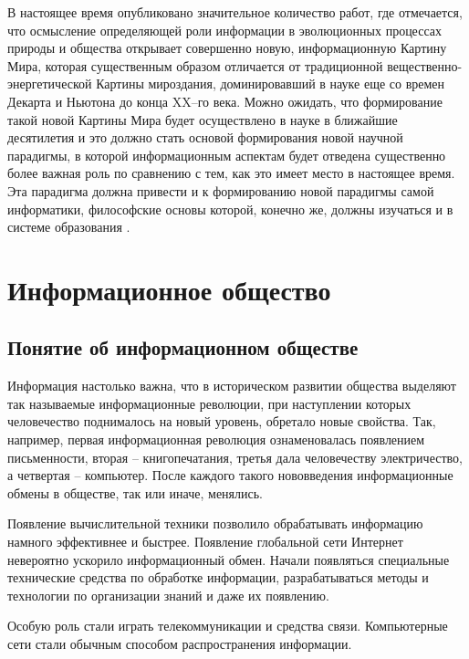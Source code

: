 В настоящее время опубликовано значительное количество работ, где отмечается, что осмысление определяющей роли информации в эволюционных процессах природы и общества открывает совершенно новую, информационную Картину Мира, которая существенным образом отличается от традиционной вещественно-энергетической Картины мироздания, доминировавший в науке еще со времен Декарта и Ньютона до конца XX–го века. Можно ожидать, что формирование такой новой Картины Мира будет осуществлено в науке в ближайшие  десятилетия и это должно стать основой формирования новой научной парадигмы, в которой информационным аспектам будет отведена существенно более важная роль по сравнению с тем, как это имеет место в настоящее время. Эта парадигма должна привести и к формированию новой парадигмы самой информатики, философские основы которой, конечно же, должны изучаться и в системе образования \cite{bib304}.




\newpage

\section{Информационное общество} \label{sect2_3}

\subsection{Понятие об информационном обществе} \label{subsect2_3_1}

Информация настолько важна, что в историческом развитии общества выделяют так называемые информационные революции, при наступлении которых человечество поднималось на новый уровень, обретало новые свойства. Так, например, первая информационная революция ознаменовалась появлением письменности, вторая – книгопечатания, третья дала человечеству электричество, а четвертая – компьютер. После каждого такого нововведения информационные обмены в обществе, так или иначе, менялись.

Появление вычислительной техники позволило обрабатывать информацию намного эффективнее и быстрее. Появление глобальной сети Интернет невероятно ускорило информационный обмен.
Начали появляться специальные технические средства по обработке информации, разрабатываться методы и технологии по организации знаний и даже их появлению.

Особую роль стали играть телекоммуникации и средства связи. Компьютерные сети стали обычным способом распространения информации.

